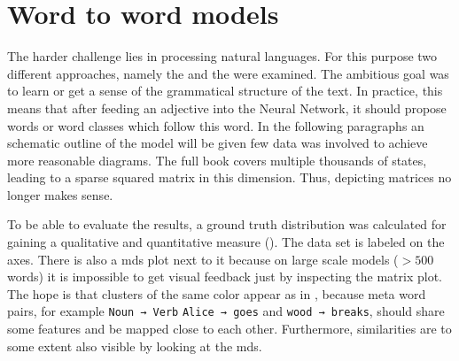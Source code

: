 \section{Word to word models} \label{sec: text based models and architecture}
The harder challenge lies in processing natural languages. For this purpose two different approaches, namely the  and the  were examined. The ambitious goal was to learn or get a sense of the grammatical structure of the text. In practice, this means that after feeding \eg an adjective into the Neural Network, it should propose words or word classes which follow this word.
In the following paragraphs an schematic outline of the model will be given \ie few data was involved to achieve more reasonable diagrams. The full book covers multiple thousands of states, leading to a sparse squared matrix in this dimension. Thus, depicting matrices no longer makes sense.

To be able to evaluate the results, a ground truth distribution was calculated for gaining a qualitative and quantitative measure (\figref{\ref{fig: text model gt}}). The data set is labeled on the axes. There is also a \gls{mds} plot next to it because on large scale models ($ > 500 $ words) it is impossible to get visual feedback just by inspecting the matrix plot. The hope is that clusters of the same color appear as in , because meta word pairs, for example \texttt{Noun → Verb} \eg \texttt{Alice → goes} and \texttt{wood → breaks}, should share some features and be mapped close to each other. Furthermore, similarities are to some extent also visible by looking at the \gls{mds}.

